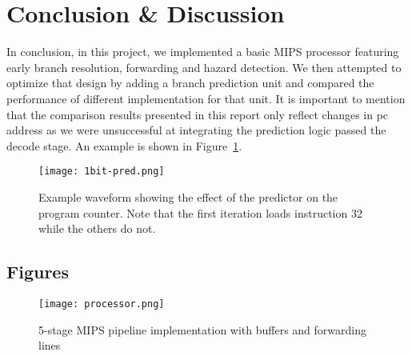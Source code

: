 \documentclass[12pt]{IEEEtran} %
\begin{document}

\section{Conclusion \& Discussion}
In conclusion, in this project, we implemented a basic MIPS processor featuring early branch resolution, forwarding and hazard detection. We then attempted to optimize that design by adding a branch prediction unit and compared the performance of different implementation for that unit. 
It is important to mention that the comparison results presented in this report only reflect changes in pc address as we were unsuccessful at integrating the prediction logic passed the decode stage. An example is shown in Figure~\ref{fig:pred}.

\begin{figure}[!htb]
    \centering
    \texttt{[image: 1bit-pred.png]}
    \caption{Example waveform showing the effect of the predictor on the program counter. Note that the first iteration loads instruction 32 while the others do not.}
    \label{fig:pred}
\end{figure}



\begin{landscape}
\begin{@twocolumnfalse}
\section*{Figures}
\begin{figure}[!htb]
    \centering
    \texttt{[image: processor.png]}
    \caption{5-stage MIPS pipeline implementation with buffers and forwarding lines }
    \label{fig:figure1}
\end{figure}
\end{@twocolumnfalse}
\end{landscape}
\end{document}
